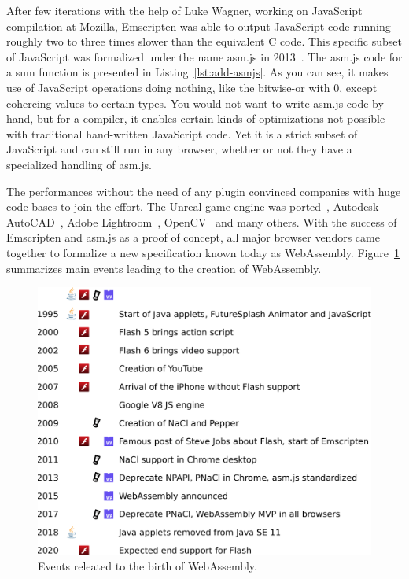 After few iterations with the help of Luke Wagner, working on JavaScript compilation at Mozilla,
Emscripten was able to output JavaScript code
running roughly two to three times slower than the equivalent C code.
This specific subset of JavaScript was formalized under the name asm.js in 2013~\cite{herman2013asm}.
The asm.js code for a sum function is presented in Listing~\ref{lst:add-asmjs}.
As you can see, it makes use of JavaScript operations doing nothing,
like the bitwise-or with 0, except cohercing values to certain types.
You would not want to write asm.js code by hand, but for a compiler,
it enables certain kinds of optimizations not possible with traditional
hand-written JavaScript code.
Yet it is a strict subset of JavaScript and can still run in any browser,
whether or not they have a specialized handling of asm.js.



The performances without the need of any plugin convinced companies with huge
code bases to join the effort.
The Unreal game engine was ported~\cite{unrealweb},
Autodesk AutoCAD~\cite{autocadweb},
Adobe Lightroom~\cite{lightroomweb},
OpenCV~\cite{taheri2018opencv} and many others.
With the success of Emscripten and asm.js as a proof of concept,
all major browser vendors came together to formalize a new specification
known today as WebAssembly.
Figure~\ref{fig:wasm-timeline} summarizes main events leading to the creation of WebAssembly.

\begin{figure}[h]
	\centering
	\includegraphics[width=\linewidth]{assets/img/wasm-timeline.pdf}
	\caption{Events releated to the birth of WebAssembly.}%
	\label{fig:wasm-timeline}
\end{figure}

